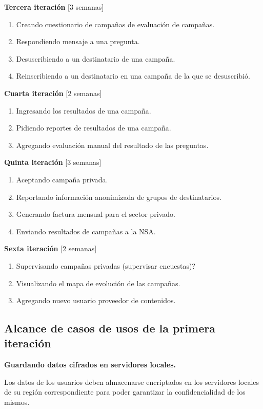 \documentclass[a4paper, 10pt, twoside]{article}
\begin{document}
\textbf{Tercera iteración} [3 semanas]
\begin{enumerate}
\item Creando cuestionario de campañas de evaluación de campañas.
\item Respondiendo mensaje a una pregunta.
\item Desuscribiendo a un destinatario de una campaña.
\item Reinscribiendo a un destinatario en una campaña de la que se desuscribió.
\end{enumerate}

\textbf{Cuarta iteración} [2 semanas]
\begin{enumerate}
\item Ingresando los resultados de una campaña.
\item Pidiendo reportes de resultados de una campaña.
\item Agregando evaluación manual del resultado de las preguntas.
\end{enumerate}

\textbf{Quinta iteración} [3 semanas]
\begin{enumerate}
\item Aceptando campaña privada.
\item Reportando información anonimizada de grupos de destinatarios.
\item Generando factura mensual para el sector privado.
\item Enviando resultados de campañas a la NSA.
\end{enumerate}

\textbf{Sexta iteración} [2 semanas]
\begin{enumerate}
\item Supervisando campañas privadas (supervisar encuestas)?
\item Visualizando el mapa de evolución de las campañas.
\item Agregando nuevo usuario proveedor de contenidos.
\end{enumerate}


\subsection{Alcance de casos de usos de la primera iteración}
\textbf{Guardando datos cifrados en servidores locales.}

Los datos de los usuarios deben almacenarse encriptados en los servidores locales de su región correspondiente para poder garantizar la confidencialidad de los mismos.
\end{document}
